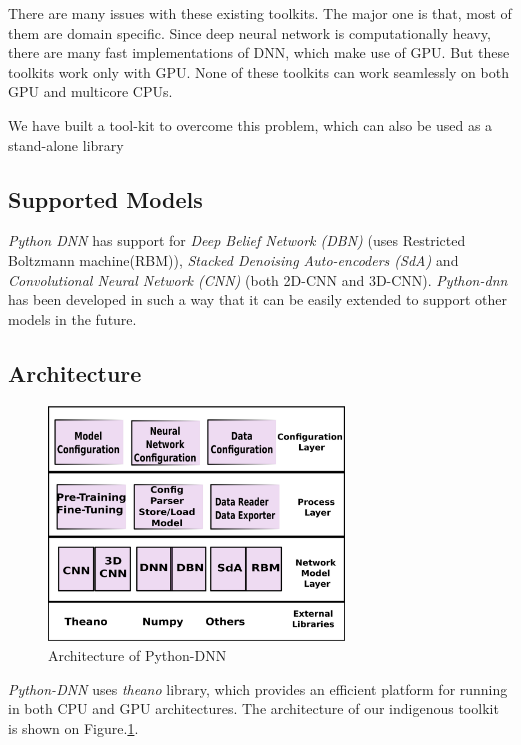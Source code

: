 There are many issues with these existing toolkits.  The major one is that, most of them are domain specific.  Since deep neural network is computationally heavy, there are many fast implementations of DNN, which make use of GPU.  But these toolkits work only with GPU.  None of these toolkits can work seamlessly on both GPU and multicore CPUs. 

We have built a tool-kit to overcome this problem, which can also be used as a stand-alone library


\subsection{Supported Models}
\label{sec:python-dnnModels}
\textit{Python DNN}  has support  for \textit{Deep Belief Network (DBN)} \cite{hinton2002training} (uses Restricted Boltzmann machine(RBM)), \textit{Stacked Denoising Auto-encoders (SdA)} \cite{vincent2010stacked} and \textit{Convolutional Neural Network (CNN)} \cite{lecun1998gradient} (both 2D-CNN and 3D-CNN). \textit{Python-dnn} has been developed in such a way that it can be easily extended to support other models in the future.

\subsection{Architecture}

\begin{figure}[ht]
\centering
\includegraphics[width=0.7\textwidth]{./imgs/Python-DNNArch.eps}
\caption{Architecture of Python-DNN}
\label{fig:pydnn-arch}
\end{figure}

\textit{Python-DNN} uses \emph{theano} library, which provides an efficient platform for running in both CPU and GPU architectures.  The architecture of our indigenous toolkit is shown on Figure.\ref{fig:pydnn-arch}. 

